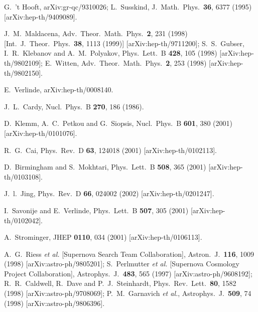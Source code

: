 \documentclass[a4paper,12pt]{article}
\begin{document}
\begin{thebibliography}{99}
G.~'t Hooft,
arXiv:gr-qc/9310026;
L.~Susskind,
J.\ Math.\ Phys.\  {\bf 36}, 6377 (1995) [arXiv:hep-th/9409089].

J.~M.~Maldacena,
Adv.\ Theor.\ Math.\ Phys.\  {\bf 2}, 231 (1998) [Int.\ J.\
Theor.\ Phys.\  {\bf 38}, 1113 (1999)] [arXiv:hep-th/9711200];
S.~S.~Gubser, I.~R.~Klebanov and A.~M.~Polyakov,
Phys.\ Lett.\ B {\bf 428}, 105 (1998) [arXiv:hep-th/9802109];
E.~Witten,
Adv.\ Theor.\ Math.\ Phys.\  {\bf 2}, 253 (1998)
[arXiv:hep-th/9802150].

E.~Verlinde,
arXiv:hep-th/0008140.

J.~L.~Cardy,
Nucl.\ Phys.\ B {\bf 270}, 186 (1986).

D.~Klemm, A.~C.~Petkou and G.~Siopsis,
Nucl.\ Phys.\ B {\bf 601}, 380 (2001) [arXiv:hep-th/0101076].

R.~G.~Cai,
Phys.\ Rev.\ D {\bf 63}, 124018 (2001) [arXiv:hep-th/0102113].

D.~Birmingham and S.~Mokhtari,
Phys.\ Lett.\ B {\bf 508}, 365 (2001) [arXiv:hep-th/0103108].

J.~l.~Jing,
Phys.\ Rev.\ D {\bf 66}, 024002 (2002) [arXiv:hep-th/0201247].

I.~Savonije and E.~Verlinde,
Phys.\ Lett.\ B {\bf 507}, 305 (2001) [arXiv:hep-th/0102042].

A.~Strominger,
JHEP {\bf 0110}, 034 (2001) [arXiv:hep-th/0106113].

A.~G.~Riess {\it et al.}  [Supernova Search Team Collaboration],
Astron.\ J.\  {\bf 116}, 1009 (1998) [arXiv:astro-ph/9805201];
S.~Perlmutter {\it et al.}  [Supernova Cosmology Project
Collaboration],
Astrophys.\ J.\  {\bf 483}, 565 (1997) [arXiv:astro-ph/9608192];
R.~R.~Caldwell, R.~Dave and P.~J.~Steinhardt,
Phys.\ Rev.\ Lett.\  {\bf 80}, 1582 (1998)
[arXiv:astro-ph/9708069];
P.~M.~Garnavich {\it et al.},
Astrophys.\ J.\  {\bf 509}, 74 (1998) [arXiv:astro-ph/9806396].


\end{thebibliography}
\end{document}

